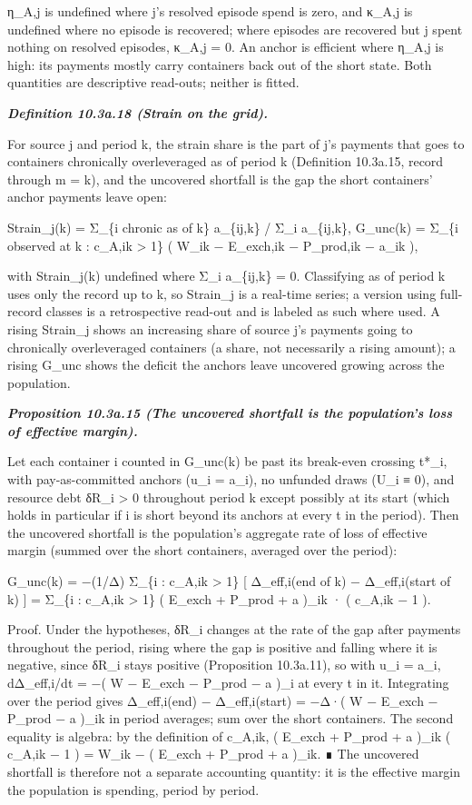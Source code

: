 \documentclass[
]{article}
\begin{document}
η\_A,j is undefined where j's resolved episode spend is zero, and κ\_A,j
is undefined where no episode is recovered; where episodes are recovered
but j spent nothing on resolved episodes, κ\_A,j = 0. An anchor is
efficient where η\_A,j is high: its payments mostly carry containers
back out of the short state. Both quantities are descriptive read-outs;
neither is fitted.

\emph{\textbf{Definition 10.3a.18 (Strain on the grid).}}

For source j and period k, the strain share is the part of j's payments
that goes to containers chronically overleveraged as of period k
(Definition 10.3a.15, record through m = k), and the uncovered shortfall
is the gap the short containers' anchor payments leave open:

Strain\_j(k) = Σ\_\{i chronic as of k\} a\_\{ij,k\} / Σ\_i a\_\{ij,k\},
G\_unc(k) = Σ\_\{i observed at k : c\_A,ik \textgreater{} 1\} ( W\_ik −
E\_exch,ik − P\_prod,ik − a\_ik ),

with Strain\_j(k) undefined where Σ\_i a\_\{ij,k\} = 0. Classifying as
of period k uses only the record up to k, so Strain\_j is a real-time
series; a version using full-record classes is a retrospective read-out
and is labeled as such where used. A rising Strain\_j shows an
increasing share of source j's payments going to chronically
overleveraged containers (a share, not necessarily a rising amount); a
rising G\_unc shows the deficit the anchors leave uncovered growing
across the population.

\emph{\textbf{Proposition 10.3a.15 (The uncovered shortfall is the
population's loss of effective margin).}}

Let each container i counted in G\_unc(k) be past its break-even
crossing t*\_i, with pay-as-committed anchors (u\_i = a\_i), no unfunded
draws (U\_i ≡ 0), and resource debt δR\_i \textgreater{} 0 throughout
period k except possibly at its start (which holds in particular if i is
short beyond its anchors at every t in the period). Then the uncovered
shortfall is the population's aggregate rate of loss of effective margin
(summed over the short containers, averaged over the period):

G\_unc(k) = −(1/Δ) Σ\_\{i : c\_A,ik \textgreater{} 1\} {[} Δ\_eff,i(end
of k) − Δ\_eff,i(start of k) {]} = Σ\_\{i : c\_A,ik \textgreater{} 1\} (
E\_exch + P\_prod + a )\_ik · ( c\_A,ik − 1 ).

Proof. Under the hypotheses, δR\_i changes at the rate of the gap after
payments throughout the period, rising where the gap is positive and
falling where it is negative, since δR\_i stays positive (Proposition
10.3a.11), so with u\_i = a\_i, dΔ\_eff,i/dt = −( W − E\_exch − P\_prod
− a )\_i at every t in it. Integrating over the period gives
Δ\_eff,i(end) − Δ\_eff,i(start) = −Δ·( W − E\_exch − P\_prod − a )\_ik
in period averages; sum over the short containers. The second equality
is algebra: by the definition of c\_A,ik, ( E\_exch + P\_prod + a )\_ik
( c\_A,ik − 1 ) = W\_ik − ( E\_exch + P\_prod + a )\_ik. ∎ The uncovered
shortfall is therefore not a separate accounting quantity: it is the
effective margin the population is spending, period by period.
\end{document}
